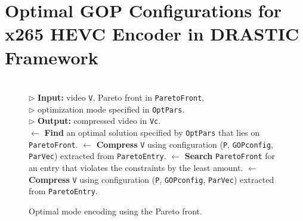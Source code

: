 \documentclass{book}
\newcommand{\COMMENT}[1]{$\triangleright$  #1}
\begin{document}
\chapter[Optimal GOP Configurations for x265 HEVC Encoder]{Optimal GOP Configurations for x265 HEVC Encoder in DRASTIC Framework}
   \begin{figure}[tb!]
   	\begin{minipage}{\columnwidth}
   		\begin{algorithmic}
   			 \\
   			\COMMENT {\textbf{Input:} video {\tt V}}, Pareto front in {\tt ParetoFront}, \\
   			\COMMENT {\hspace{0.25 true in}optimization mode specified in {\tt OptPars}.}  \\
   			\COMMENT {\textbf{Output:}  compressed video in {\tt Vc}.} \\
   			 $\gets$ \textbf{Find} an optimal solution specified 
   			\State \hspace{0.6 true in} by {\tt OptPars} that lies on {\tt ParetoFront}.
   			 $\gets$ \textbf{Compress} {\tt V} using configuration
   			\State \hspace{0.25 true in} ({\tt P}, {\tt GOPconfig}, {\tt ParVec})
   			\State \hspace{0.25 true in} extracted from {\tt ParetoEntry}.
   			\Else 
   			 $\gets$ \textbf{Search} {\tt ParetoFront} 
   			\State \hspace{0.25 true in} for an entry that violates the constraints by the
   			\State \hspace{0.25 true in} least amount. 
   			 $\gets$ \textbf{Compress} {\tt V} using configuration
   			\State \hspace{0.25 true in} ({\tt P}, {\tt GOPconfig}, {\tt ParVec}) 
   			\State \hspace{0.25 true in} extracted from {\tt ParetoEntry}. 
   			\EndIf
   			\EndFunction
   		\end{algorithmic}
   	\end{minipage}
   	\caption{Optimal mode encoding using the Pareto front.
   	}\label{fig:Optimization}
   \end{figure}
  
\end{document}
